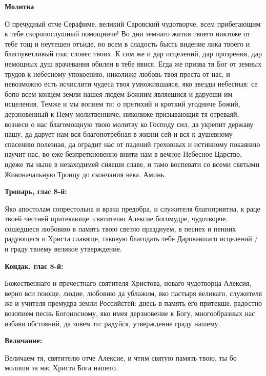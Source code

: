 \medskip
\bfseries Молитва\normalfont{}


О пречудный отче Серафиме, великий Саровский чудотворче, всем прибегающим к тебе скоропослушный помощниче! Во дни земнаго жития твоего никтоже от тебе тощ и неутешен отъиде, но всем в сладость бысть видение лика твоего и благоуветливый глас словес твоих. К сим же и дар исцелений, дар прозрения, дар немощных душ врачевания обилен в тебе явися. Егда же призва тя Бог от земных трудов к небесному упокоению, николиже любовь твоя преста от нас, и невозможно есть исчислити чудеса твоя умножившаяся, яко звезды небесныя: се бопо всем концем земли нашея людем Божиим являешися и даруеши им исцеления. Темже и мы вопием ти: о претихий и кроткий угодниче Божий, дерзновенный к Нему молитвенниче, николиже призывающия тя отреваяй, вознеси о нас благомощную твою молитву ко Господу сил, да укрепит державу нашу, да дарует нам вся благопотребная в жизни сей и вся к душевному спасению полезная, да оградит нас от падений греховных и истинному покаянию научит нас, во еже безпреткновенно внити нам в вечное Небесное Царство, идеже ты ныне в незаходимей сияеши славе, и тамо воспевати со всеми святыми Живоначальную Троицу до скончания века. Аминь.

\bigskip\bigskip\mychapterending

 
\bfseries Тропарь, глас 8-й:\normalfont{}


Яко апостолам сопрестольна и врача предобра,  и служителя благоприятна,  к раце твоей честней притекающе. святителю Алексие богомудре, чудотворче,  сошедшеся любовию в память твою светло празднуем,  в песнех и пениих радующеся и Христа славяще,  таковую благодать тебе Даровавшаго исцелений / и граду твоему великое утверждение. 


\medskip
\bfseries Кондак, глас 8-й:\normalfont{}

Божественнаго и пречестнаго святителя Христова, новаго чудотворца Алексия, верно вси поюще, людие, любовию да ублажим, яко пастыря великаго, служителя же и учителя премудра земли Российстей: днесь в память его притекше, радостно возопием песнь Богоносному, яко имея дерзновение к Богу, многообразных нас избави обстояний, да зовем ти: радуйся, утверждение граду нашему.


\medskip
\bfseries Величание:\normalfont{}


Величаем тя, святителю отче Алексие, и чтим святую память твою, ты бо молиши за нас Христа Бога нашего.


